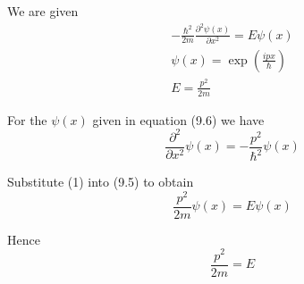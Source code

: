 


\bigskip
We are given
\begin{gather*}
-\frac{\hbar^2}{2m}\frac{\partial^2\psi(x)}{\partial x^2}=E\psi(x)\tag{9.5}
\\[1ex]
\psi(x)=\exp\left(\frac{ipx}{\hbar}\right)\tag{9.6}
\\[1ex]
E=\frac{p^2}{2m}\tag{9.7}
\end{gather*}

For the $\psi(x)$ given in equation (9.6) we have
\begin{equation*}
\frac{\partial^2}{\partial x^2}\psi(x)
=-\frac{p^2}{\hbar^2}\psi(x)
\tag{1}
\end{equation*}

Substitute (1) into (9.5) to obtain
\begin{equation*}
\frac{p^2}{2m}\psi(x)=E\psi(x)
\end{equation*}

Hence
\begin{equation*}
\frac{p^2}{2m}=E
\end{equation*}


